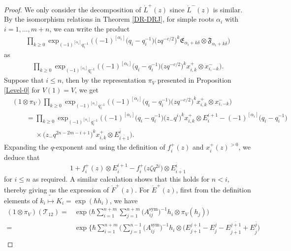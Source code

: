 \documentclass[10pt,a4paper]{amsart}
\numberwithin{equation}{section}
\begin{document}
\begin{proof} We only consider the decomposition of $\dot{L}^+(z)$ since $\dot{L}^-(z)$ is similar.
By the isomorphism relations in Theorem \ref{DR-DRJ}, for simple roots $\alpha_i$ with $i=1,\dots,m+n$, we can write the product
\begin{align*}
\prod\limits_{k\geq0 }\exp_{(-1)^{[\alpha_i]}q_{i}^{-1}}\bigl((-1)^{[\alpha_i]}\bigl(q_{i}-q_{i}^{-1}\bigr)\bigl(zq^{-c/2}\bigr)^k\mathfrak{E}_{\alpha_i+k\delta}\otimes \mathfrak{F}_{\alpha_i+k\delta}\bigr)
\end{align*}as
\begin{align*}
\prod\limits_{k\geq0 }\exp_{(-1)^{[\alpha_i]}q_{i}^{-1}}\bigl((-1)^{[\alpha_i]}\bigl(q_{i}-q_{i}^{-1}\bigr)\bigl(zq^{-c/2}\bigr)^k x^{+}_{i,k}\otimes x^{-}_{i,-k}\bigr).
\end{align*}
Suppose that $i\leq n$, then by the representation $\pi_{V}$ presented in Proposition \ref{Level-0} for $V(1)=V$, we get
\begin{align*}
&(1\otimes\pi_V) \prod\limits_{k\geq0 }\exp_{(-1)^{[\alpha_i]}q_{i}^{-1}}\bigl((-1)^{[\alpha_i]}\bigl(q_{i}-q_{i}^{-1}\bigr)\bigl(zq^{-c/2}\bigr)^k x^{+}_{i,k}\otimes x^{-}_{i,-k}\bigr)\\
&\qquad=\prod\limits_{k\geq0 }\exp_{(-1)^{[\alpha_i]}q_{i}^{-1}}\bigl((-1)^{[\alpha_i]}\bigl(q_{i}-q_{i}^{-1}\bigr)\bigl(z_-q^{i}\bigr)^k x^{+}_{i,k}\otimes E^{i+1}_i-(-1)^{[\alpha_i]}\bigl(q_{i}-q_{i}^{-1}\bigr)\\
&\phantom{\qquad=}{}\times\bigl(z_-q^{2n-2m-i+1}\bigr)^k x^{+}_{i,k}\otimes E^{\overline{i}}_{\overline{i+1}}\bigr).
\end{align*}
Expanding the $q$-exponent and using the definition of $f_i^+(z)$ and $x_i^+(z)^{>0}$, we deduce that \[1+f_i^+(z)\otimes E^{i+1}_i-f_i^+\bigl(z\zeta q^{2i}\bigr)\otimes E^{\overline{i}}_{\overline{i+1}}\] for $i\leq n$ as required. A similar calculation shows that this holds for $n<i$, thereby giving us the expression of $\dot{F}^+(z)$.
For $\dot{E}^+(z)$, first from the definition elements of $k_i\tilde{\mapsto} K_i=\exp(\hbar h_i)$, we have
\begin{align*}
(1\otimes\pi_V)(\mathcal{T}_{12})={}&\exp\Biggl(\hbar\sum\limits_{i=1}^{n+m}\sum\limits_{j=1}^{n+m}\bigl(A_{ij}^{\operatorname{sym}}\bigr)^{-1}h_i\otimes\pi_V(h_j)\Biggr)\\
={}&\exp\Biggl\{\hbar\sum\limits_{i=1}^{n+m}\Biggl(\sum\limits_{j=1}^{n-1}\bigl(A_{ij}^{\operatorname{sym}}\bigr)^{-1}h_i\otimes
\bigl(E^{j+1}_{j+1}-E^{j}_{j}-E^{\overline{j+1}}_{\overline{j+1}}+E^{\overline{j}}_{\overline{j}}\bigr)\\

\end{align*}
\end{proof}
\end{document}
